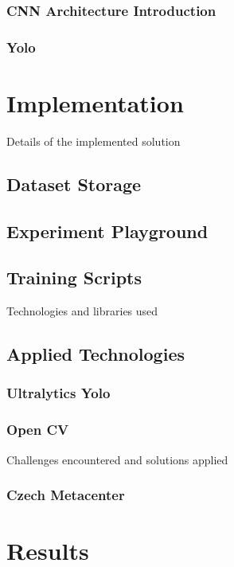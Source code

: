 \documentclass[english, ing, kiv, he, iso690alph, pdf, viewonly]{fasthesis}
\begin{document}
\subsection{CNN Architecture Introduction}



\subsection{Yolo}





\chapter{Implementation}


Details of the implemented solution
\section{Dataset Storage}

\section{Experiment Playground}

\section{Training Scripts}


Technologies and libraries used
\section{Applied Technologies}

\subsection{Ultralytics Yolo}

\subsection{Open CV}

Challenges encountered and solutions applied
\subsection{Czech Metacenter}

\chapter{Results}
\end{document}
